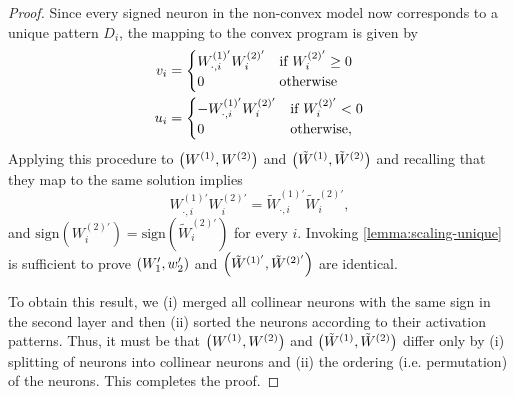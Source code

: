 \begin{proof}
    Since every signed neuron in the non-convex model now
    corresponds to a unique pattern \( D_i \), the mapping to the convex
    program is given by
    \[
        \begin{aligned}
            v_{i} & =
            \begin{cases}
                W^{(1)'}_{\cdot, i} W^{(2)'}_{i} & \mbox{if \( W^{(2)'}_{i} \geq 0 \)} \\
                0                                & \mbox{otherwise}
            \end{cases} \\
            u_{i} & =
            \begin{cases}
                -W^{(1)'}_{\cdot, i} W^{(2)'}_{i} & \mbox{if \( W^{(2)'}_{i} < 0 \)} \\
                0                                 & \mbox{otherwise},
            \end{cases}
        \end{aligned}
    \]
    Applying this procedure to \( \left(W^{(1)}, W^{(2)}\right) \) and \( \left(\tilde W^{(1)},
        \tilde W^{(2)}\right) \) and recalling that they map to the same solution implies
    \[
        W^{(1)'}_{\cdot, i} W^{(2)'}_{i} = \tilde W^{(1)'}_{\cdot, i} \tilde W^{(2)'}_{i},
    \]
    and \( \text{sign}(W^{(2)'}_{i}) = \text{sign}(\tilde W^{(2)'}_{i}) \)
    for every \( i \).
    Invoking \cref{lemma:scaling-unique} is sufficient to prove \( \left(W'_{1},
    w'_{2}\right) \) and \( \left(\tilde W^{(1)'}, \tilde W^{(2)'}\right) \) are identical.

    To obtain this result, we (i) merged all collinear neurons with the same
    sign in the second layer and then (ii) sorted the neurons according to
    their activation patterns.
    Thus, it must be that \( \left(W^{(1)}, W^{(2)}\right) \) and \( \left(\tilde W^{(1)}, \tilde W^{(2)}\right) \)
    differ only by (i) splitting of neurons into collinear neurons and (ii)
    the ordering (i.e. permutation) of the neurons.
    This completes the proof.
\end{proof}

